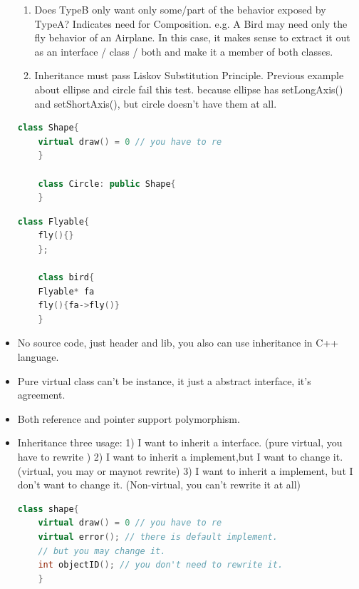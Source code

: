 \documentclass[a4paper,12pt,twoside]{book}
\begin{document}
\begin{itemize}
\begin{enumerate}
		\item Does TypeB only want only some/part of the behavior exposed by TypeA? Indicates need for Composition. e.g. A Bird may need only the fly behavior of an Airplane. In this case, it makes sense to extract it out as an interface / class / both and make it a member of both classes.
		
		\item Inheritance must pass Liskov Substitution Principle. Previous example about ellipse and circle fail this test. because ellipse has setLongAxis() and setShortAxis(), but circle doesn't have them at all.
	\end{enumerate}
	\begin{lstlisting}[frame=single, language=c++]
	class Shape{
	virtual draw() = 0 // you have to re
	}
	
	class Circle: public Shape{
	}
	\end{lstlisting}
	
	\begin{lstlisting}[frame=single, language=c++]
	class Flyable{
	fly(){}
	};
	
	class bird{
	Flyable* fa
	fly(){fa->fly()}
	}
	\end{lstlisting}
	
	\item No source code, just header and lib, you also can use inheritance in C++ language.
	
	\item Pure virtual class can't be instance, it just a abstract interface, it's agreement.
	
	\item Both reference and pointer support polymorphism.
	
	\item Inheritance three usage: 1) I want to inherit a interface. (pure virtual, you have to rewrite ) 2) I want to inherit a implement,but I want to change it. (virtual, you may or maynot rewrite) 3) I want to inherit a implement, but I don't want to change it. (Non-virtual, you can't rewrite it at all)
	\begin{lstlisting}[frame=single, language=c++]
	class shape{
	virtual draw() = 0 // you have to re
	virtual error(); // there is default implement.
	// but you may change it.
	int objectID(); // you don't need to rewrite it.
	}
	\end{lstlisting}
	

\end{itemize}
\end{document}
